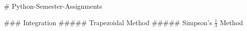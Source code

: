 # Python-Semester-Assignments



### Integration 
##### Trapezoidal Method
##### Simpson's $\frac{1}{3}$ Method
